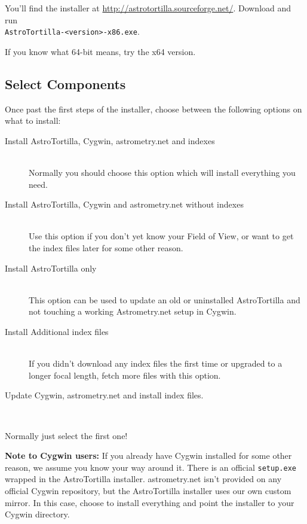 \documentclass[english]{article}
\newcommand{\surl}[1]{{\small \url{#1}}}
\begin{document}
You'll find the installer at \surl{http://astrotortilla.sourceforge.net/}.
Download and run \\\texttt{AstroTortilla-<version>-x86.exe}. 

If you know what 64-bit means, try the x64 version.

\subsection{Select Components}

Once past the first steps of the installer, choose between the following options on what to install:
\begin{description}
\item [Install AstroTortilla, Cygwin, astrometry.net and indexes] \hfill \\
Normally you should choose this option which will install everything you need. 

\item [Install AstroTortilla, Cygwin and astrometry.net without indexes]\hfill \\
Use this option if you don't yet know your Field of View, or want to get the index files later for some other reason.

\item [Install AstroTortilla only] \hfill \\
This option can be used to update an old or uninstalled AstroTortilla and not touching a working Astrometry.net setup in Cygwin.

\item [Install Additional index files] \hfill \\
If you didn't download any index files the first time or upgraded to a longer focal length, fetch more files with this option.

\item [Update Cygwin, astrometry.net and install index files.] \hfill \\

\end{description}

Normally just select the first one!

{\scriptsize \textbf{Note to Cygwin users:} If you already have Cygwin installed for some other reason, we assume you know your way around it. There is an official \texttt{setup.exe} wrapped in the AstroTortilla installer. astrometry.net isn't provided on any official Cygwin repository, but the AstroTortilla installer uses our own custom mirror. In this case, choose to install everything and point the installer to your Cygwin directory.}
\end{document}
